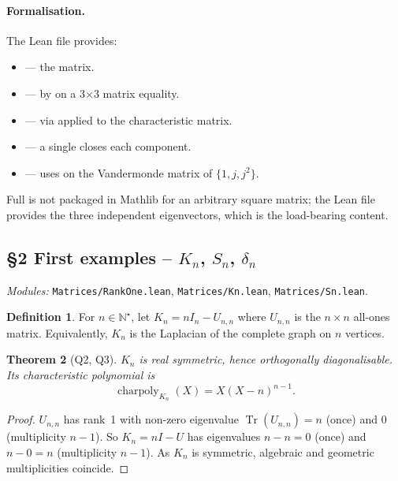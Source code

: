 \documentclass[11pt,a4paper]{article}
\newcommand{\lmod}[1]{\texttt{\small #1}}
\newcommand{\Nstar}{\mathbb{N}^\star}
\newcommand{\Tr}{\operatorname{Tr}}
\newcommand{\charpoly}{\operatorname{charpoly}}
\theoremstyle{plain}
\newtheorem{theorem}{Theorem}[section]
\theoremstyle{definition}
\newtheorem{definition}[theorem]{Definition}
\begin{document}
\paragraph{Formalisation.}
The Lean file provides:
\begin{itemize}[leftmargin=1.3em]
  \item {} --- the matrix.
  \item {} --- by
         on a 3$\times$3 matrix equality.
  \item {}
        --- via  applied to the
        characteristic matrix.
  \item {}
        --- a single  closes each component.
  \item {}
        --- uses  on the
        Vandermonde matrix of $\{1, j, j^2\}$.
\end{itemize}
Full  is not packaged in Mathlib for an
arbitrary square matrix; the Lean file provides the three independent
eigenvectors, which is the load-bearing content.

\subsection{\S2 First examples -- \texorpdfstring{$K_n$}{Kn}, \texorpdfstring{$S_n$}{Sn}, \texorpdfstring{$\delta_n$}{delta\_n}}
\emph{Modules:} \lmod{Matrices/RankOne.lean}, \lmod{Matrices/Kn.lean}, \lmod{Matrices/Sn.lean}.

\begin{definition}
For $n \in \Nstar$, let
$K_n = n I_n - U_{n,n}$ where $U_{n,n}$ is the $n\times n$ all-ones
matrix. Equivalently, $K_n$ is the Laplacian of the complete graph on
$n$ vertices.
\end{definition}

\begin{theorem}[Q2, Q3]\label{thm:Kn-spectrum}
$K_n$ is real symmetric, hence orthogonally diagonalisable. Its
characteristic polynomial is
\[ \charpoly_{K_n}(X) = X (X - n)^{n-1}. \]
\end{theorem}

\begin{proof}
$U_{n,n}$ has rank~1 with non-zero eigenvalue $\Tr(U_{n,n}) = n$ (once)
and 0 (multiplicity $n-1$). So $K_n = n I - U$ has eigenvalues
$n - n = 0$ (once) and $n - 0 = n$ (multiplicity $n-1$). As $K_n$ is
symmetric, algebraic and geometric multiplicities coincide.
\end{proof}
\end{document}
